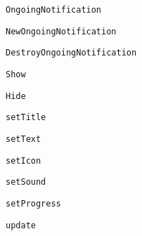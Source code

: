 \begin{DoxyItemize}
\item {\tt Ongoing\-Notification}
\begin{DoxyItemize}
\item {\tt New\-Ongoing\-Notification}
\item {\tt Destroy\-Ongoing\-Notification}
\item {\tt Show}
\item {\tt Hide}
\item {\tt set\-Title}
\item {\tt set\-Text}
\item {\tt set\-Icon}
\item {\tt set\-Sound}
\item {\tt set\-Progress}
\item {\tt update} 
\end{DoxyItemize}
\end{DoxyItemize}